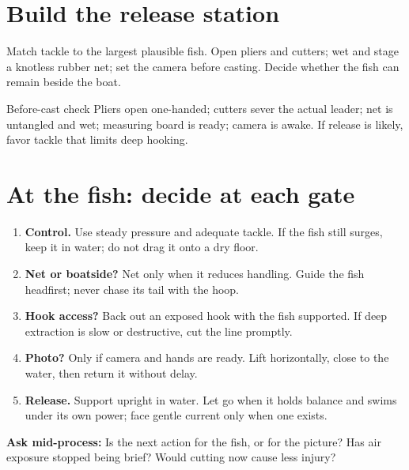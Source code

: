 
\section{Build the release station}
Match tackle to the largest plausible fish. Open pliers and cutters; wet and
stage a knotless rubber net; set the camera before casting. Decide whether the
fish can remain beside the boat.
\begin{center}
\end{center}
\begin{telospanel}{Before-cast check}
Pliers open one-handed; cutters sever the actual leader; net is untangled and
wet; measuring board is ready; camera is awake. If release is likely, favor
tackle that limits deep hooking.
\end{telospanel}

\section{At the fish: decide at each gate}
\begin{enumerate}
\item \textbf{Control.} Use steady pressure and adequate tackle. If the fish
still surges, keep it in water; do not drag it onto a dry floor.
\item \textbf{Net or boatside?} Net only when it reduces handling. Guide the
fish headfirst; never chase its tail with the hoop.
\item \textbf{Hook access?} Back out an exposed hook with the fish supported.
If deep extraction is slow or destructive, cut the line promptly.
\item \textbf{Photo?} Only if camera and hands are ready. Lift horizontally,
close to the water, then return it without delay.
\item \textbf{Release.} Support upright in water. Let go when it holds balance
and swims under its own power; face gentle current only when one exists.
\end{enumerate}
\textbf{Ask mid-process:} Is the next action for the fish, or for the picture?
Has air exposure stopped being brief? Would cutting now cause less injury?

